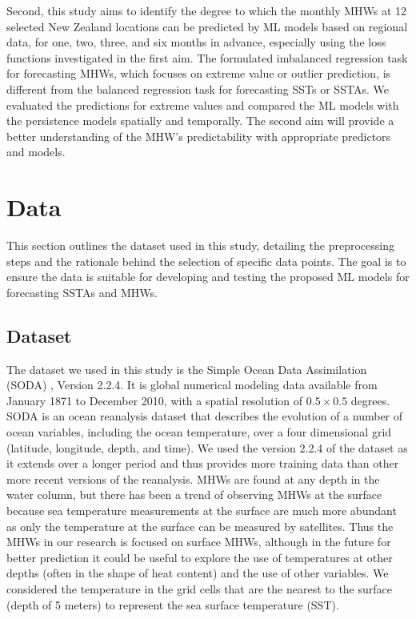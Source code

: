 \documentclass[11pt, a4paper]{article}
\begin{document}
Second, this study aims to identify the degree to which the monthly MHWs at 12 selected New Zealand locations can be predicted by ML models based on regional data, for one, two, three, and six months in advance, especially using the loss functions investigated in the first aim. The formulated imbalanced regression task for forecasting MHWs, which focuses on extreme value or outlier prediction, is different from the balanced regression task for forecasting SSTs or SSTAs. We evaluated the predictions for extreme values and compared the ML models with the persistence models spatially and temporally. The second aim will provide a better understanding of the MHW's predictability with appropriate predictors and models.

\section{Data}

This section outlines the dataset used in this study, detailing the preprocessing steps and the rationale behind the selection of specific data points. The goal is to ensure the data is suitable for developing and testing the proposed ML models for forecasting SSTAs and MHWs.

\subsection{Dataset}

The dataset we used in this study is the Simple Ocean Data Assimilation (SODA) \citep{carton2008reanalysis}, Version 2.2.4. It is global numerical modeling data available from January 1871 to December 2010, with a spatial resolution of $0.5\times0.5$ degrees. SODA is an ocean reanalysis dataset that describes the evolution of a number of ocean variables, including the ocean temperature, over a four dimensional grid (latitude, longitude, depth, and time). We used the version 2.2.4 of the dataset as it extends over a longer period and thus provides more training data than other more recent versions of the reanalysis. MHWs are found at any depth in the water column, but there has been a trend of observing MHWs at the surface because sea temperature measurements at the surface are much more abundant as only the temperature at the surface can be measured by satellites. Thus the MHWs in our research is focused on surface MHWs, although in the future for better prediction it could be useful to explore the use of temperatures at other depths (often in the shape of heat content) and the use of other variables. We considered the temperature in the grid cells that are the nearest to the surface (depth of 5 meters) to represent the sea surface temperature (SST).
\end{document}
